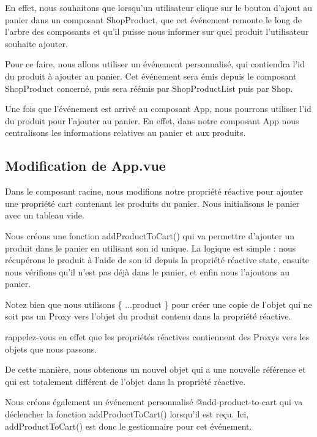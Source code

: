 \documentclass{article}
\begin{document}
En effet, nous souhaitons que lorsqu'un utilisateur clique sur le bouton d'ajout au panier dans un composant {\color{monOrange}ShopProduct}, que cet événement remonte le long de l'arbre des composants et qu'il puisse nous informer sur quel produit l'utilisateur souhaite ajouter.

Pour ce faire, nous allons utiliser un événement personnalisé, qui contiendra l'{\color{monOrange}id} du produit à ajouter au panier. Cet événement sera émis depuis le composant {\color{monOrange}ShopProduct} concerné, puis sera réémis par {\color{monOrange}ShopProductList} puis par {\color{monOrange}Shop}.

Une fois que l'événement est arrivé au composant {\color{monOrange}App}, nous pourrons utiliser l'{\color{monOrange}id} du produit pour l'ajouter au panier. En effet, dans notre composant {\color{monOrange}App} nous centralisons les informations relatives au panier et aux produits.

\subsection{Modification de {\color{monOrange}App.vue}}
Dans le composant racine, nous modifions notre propriété réactive pour ajouter une propriété {\color{monOrange}cart} contenant les produits du panier. Nous initialisons le panier avec un tableau vide.

Nous créons une fonction {\color{monOrange}addProductToCart()} qui va permettre d'ajouter un produit dans le panier en utilisant son id unique. La logique est simple : nous récupérons le produit à l'aide de son id depuis la propriété réactive {\color{monOrange}state}, ensuite nous vérifions qu'il n'est pas déjà dans le panier, et enfin nous l'ajoutons au panier.

Notez bien que nous utilisons {\color{monOrange}\{ ...product \}} pour créer une copie de l'objet qui ne soit pas un {\color{monOrange}Proxy} vers l'objet du produit contenu dans la propriété réactive.

rappelez-vous en effet que les propriétés réactives contiennent des {\color{monOrange}Proxys} vers les objets que nous passons.

De cette manière, nous obtenons un nouvel objet qui a une nouvelle référence et qui est totalement différent de l'objet dans la propriété réactive.

Nous créons également un événement personnalisé {\color{monOrange}@add-product-to-cart} qui va déclencher la fonction {\color{monOrange}addProductToCart()} lorsqu'il est reçu. Ici, {\color{monOrange}addProductToCart()} est donc le gestionnaire pour cet événement.
\end{document}
